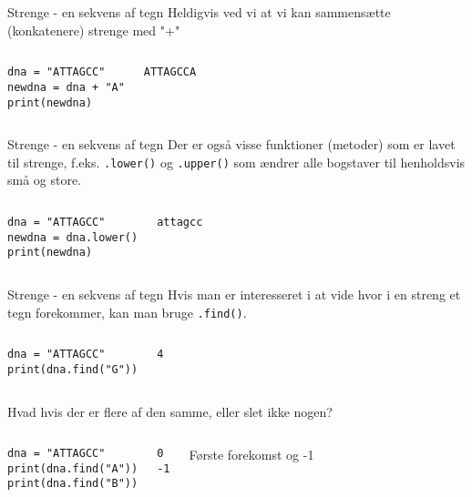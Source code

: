\documentclass[main.tex]{subfiles}
\begin{document}
\begin{frame}[fragile]{Strenge - en sekvens af tegn}
	Heldigvis ved vi at vi kan sammensætte (konkatenere) strenge med "+"
		\begin{columns}
		\begin{lstlisting}[style=python]
dna = "ATTAGCC"
newdna = dna + "A"
print(newdna)
		\end{lstlisting}
		
		\pause
		\begin{lstlisting}[style=python]
ATTAGCCA
		\end{lstlisting}
	\end{columns}
\end{frame}


\begin{frame}[fragile]{Strenge - en sekvens af tegn}
	Der er også visse funktioner (metoder) som er lavet til strenge, f.eks. \texttt{.lower()} og \texttt{.upper()} som ændrer alle bogstaver til henholdsvis små og store.
	\begin{columns}
		\column{0.4\textwidth}
		\begin{lstlisting}[style=python]
dna = "ATTAGCC"
newdna = dna.lower()
print(newdna)
		\end{lstlisting}
		
		\pause
		\column{0.4\textwidth}
		\begin{lstlisting}[style=python]
attagcc
		\end{lstlisting}
	\end{columns}
\end{frame}

\begin{frame}[fragile]{Strenge - en sekvens af tegn}
	Hvis man er interesseret i at vide hvor i en streng et tegn forekommer, kan man bruge \texttt{.find()}.
	\begin{columns}
		\begin{lstlisting}[style=python]
dna = "ATTAGCC"
print(dna.find("G"))
		\end{lstlisting}
		
		\pause
		\begin{lstlisting}[style=python]
4
		\end{lstlisting}
	\end{columns}
	\pause
	Hvad hvis der er flere af den samme, eller slet ikke nogen?
	\begin{columns}
		\column{0.4\textwidth}
		\begin{lstlisting}[style=python]
dna = "ATTAGCC"
print(dna.find("A"))
print(dna.find("B"))
		\end{lstlisting}
		
		\pause
		\column{0.4\textwidth}
		\begin{lstlisting}[style=python]
0
-1
		\end{lstlisting}
		Første forekomst og -1
	\end{columns}
\end{frame}
\end{document}
